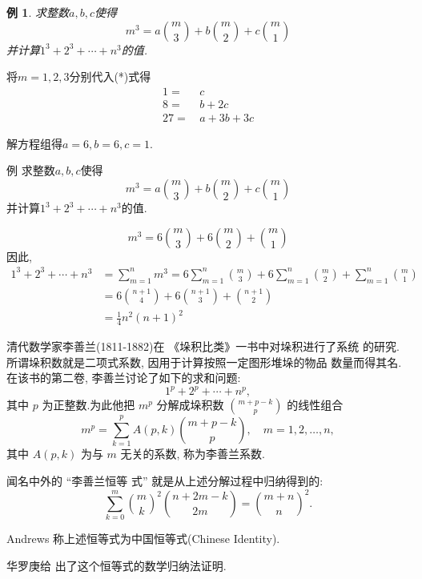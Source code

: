 \documentclass[punct]{ctexbeamer}
\newtheorem{ex}{例}[section]
\begin{document}
\begin{frame}
    \begin{ex}
        求整数$a,b,c$使得\[m^{3}=a\binom{m}{3}+b\binom{m}{2}+c\binom{m}{1}\tag{*}\]并计算$1^{3}+2^{3}+\cdots+n^{3}$的值.
    \end{ex}
    \pause
    将$m=1,2,3$分别代入(*)式得
    \begin{align*}
        1 = &\,  c \\
        8 = &\,  b+2 c \\
        27 = &\,   a+3 b+3 c
    \end{align*}

    解方程组得$a=6,b=6,c=1$.

\end{frame}

\begin{frame}
    \begin{block}{例}
        求整数$a,b,c$使得\[m^{3}=a\binom{m}{3}+b\binom{m}{2}+c\binom{m}{1}\tag{*}\]并计算$1^{3}+2^{3}+\cdots+n^{3}$的值.
    \end{block}
    \[m^{3}=6\binom{m}{3}+6\binom{m}{2}+\binom{m}{1}\]
    因此,
    \[\begin{aligned}
        1^{3}+2^{3}+\cdots+n^{3} &=\sum_{m=1}^{n} m^{3}
        =6 \sum_{m=1}^{n}\binom{m}{3} +6 \sum_{m=1}^{n} \binom{m}{2}+\sum_{m=1}^{n}\binom{m}{1}\\
        &=6\binom{n+1}{4}+6\binom{n+1}{3}+\binom{n+1}{2} \\
        &=\frac{1}{4} n^{2}(n+1)^{2}
    \end{aligned}\]

\end{frame}

\begin{frame}
清代数学家李善兰(1811-1882)在 《垛积比类》一书中对垛积进行了系统 的研究.所谓垛积数就是二项式系数, 因用于计算按照一定图形堆垛的物品 数量而得其名.在该书的第二卷, 李善兰讨论了如下的求和问题:
$$
1^p+2^p+\cdots+n^p,
$$
其中 $p$ 为正整数.为此他把 $m^p$ 分解成垛积数 $\binom{ m+p-k}{p}$ 的线性组合
$$
m^p=\sum_{k=1}^p A(p, k) \binom{ m+p-k}{p}, \quad m=1,2, \ldots, n,
$$
其中 $A(p, k)$ 为与 $m$ 无关的系数, 称为李善兰系数.

闻名中外的 “李善兰恒等 式” 就是从上述分解过程中归纳得到的:
$$
\sum_{k=0}^m \binom{m}{k}^2
    \binom{n+2 m-k}{2 m}
=\binom{m+n
}{n}^2 .
$$

Andrews 称上述恒等式为中国恒等式(Chinese Identity).

华罗庚给 出了这个恒等式的数学归纳法证明.
\end{frame}
\end{document}
